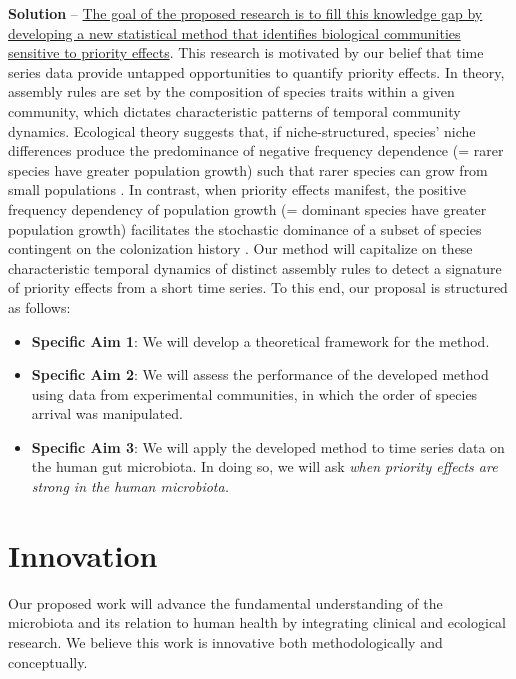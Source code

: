 \documentclass[12pt, class=article, crop=false]{standalone}
\begin{document}
\textbf{Solution} --
\ul{The goal of the proposed research is to fill this knowledge gap by developing a new statistical method that identifies biological communities sensitive to priority effects}.
This research is motivated by our belief that time series data provide untapped opportunities to quantify priority effects.
In theory, assembly rules are set by the composition of species traits within a given community, which dictates characteristic patterns of temporal community dynamics.
Ecological theory suggests that, if niche-structured, species' niche differences produce the predominance of negative frequency dependence (= rarer species have greater population growth) such that rarer species can grow from small populations \citep{loreau_does_2004, carroll_niche_2011, ke_coexistence_2018}.
In contrast, when priority effects manifest, the positive frequency dependency of population growth (= dominant species have greater population growth) facilitates the stochastic dominance of a subset of species contingent on the colonization history \citep{ke_coexistence_2018}.
Our method will capitalize on these characteristic temporal dynamics of distinct assembly rules to detect a signature of priority effects from a short time series.
To this end, our proposal is structured as follows:

\begin{itemize}
    \item \textbf{Specific Aim 1}: We will develop a theoretical framework for the method.
    \item \textbf{Specific Aim 2}: We will assess the performance of the developed method using data from experimental communities, in which the order of species arrival was manipulated.
    \item \textbf{Specific Aim 3}: We will apply the developed method to time series data on the human gut microbiota.
    In doing so, we will ask \textit{when priority effects are strong in the human microbiota.}
\end{itemize}

\section{Innovation}
Our proposed work will advance the fundamental understanding of the microbiota and its relation to human health by integrating clinical and ecological research.
We believe this work is innovative both methodologically and conceptually.
\end{document}
